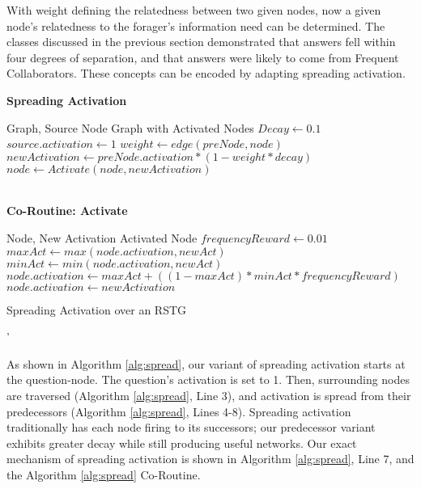 With weight defining the relatedness between two given nodes, now a given node's relatedness to the forager's information need can be determined. The classes discussed in the previous section demonstrated that answers fell within four degrees of separation, and that answers were likely to come from Frequent Collaborators. These concepts can be encoded by adapting spreading activation.


\begin{algorithm}
	\textbf{Spreading Activation}
	\begin{algorithmic}[1]
		\renewcommand{\algorithmicrequire}{\textbf{Input:}}
 		\renewcommand{\algorithmicensure}{\textbf{Output:}}
		\REQUIRE Graph, Source Node 
		\ENSURE Graph with Activated Nodes
		\STATE $Decay \leftarrow 0.1$
		\STATE $source.activation\leftarrow 1$
						\STATE $weight \leftarrow edge(preNode,node)$
						\STATE $newActivation \leftarrow preNode.activation * (1 - weight * decay)$
						\STATE $node \leftarrow Activate(node, newActivation)$
					\ENDIF
				\ENDFOR
			\ENDFOR
	\end{algorithmic}
	~\\
	\textbf{Co-Routine: Activate}
	\begin{algorithmic}[1]
		\renewcommand{\algorithmicrequire}{\textbf{Input:}}
 		\renewcommand{\algorithmicensure}{\textbf{Output:}}
		\REQUIRE Node, New Activation
		\ENSURE Activated Node
		\STATE $frequencyReward \leftarrow 0.01$
			\STATE $maxAct \leftarrow max(node.activation, newAct)$
			\STATE $minAct \leftarrow min(node.activation, newAct)$
			\STATE $node.activation \leftarrow maxAct + ((1-maxAct) * minAct * frequencyReward)$
		\ELSE
			\STATE $node.activation \leftarrow newActivation$
		\ENDIF
	\end{algorithmic}
\caption{Spreading Activation over an RSTG}
\label{alg:spread}'
\end{algorithm}

As shown in Algorithm \ref{alg:spread}, our variant of spreading activation starts at the question-node. The question's activation is set to 1. Then, surrounding nodes are traversed (Algorithm \ref{alg:spread}, Line 3), and activation is spread from their predecessors (Algorithm \ref{alg:spread}, Lines 4-8). Spreading activation traditionally has each node firing to its successors; our predecessor variant exhibits greater decay while still producing useful networks. Our exact mechanism of spreading activation is shown in Algorithm \ref{alg:spread}, Line 7, and the Algorithm \ref{alg:spread} Co-Routine.

